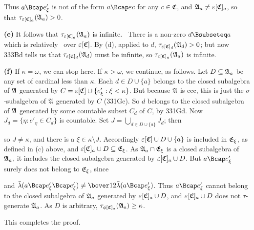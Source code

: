 {\noindent Thus $a\Bcap e'_{\xi}$ is not of the form $a\Bcap\varepsilon c$
for any $c\in\frak C$, and $\frak A_a\ne\varepsilon[\frak C]_a$, so that
$\tau_{\varepsilon[\frak C]_a}(\frak A_a)>0$.\ \Qed

\medskip

{\bf (e)} It follows that $\tau_{\varepsilon[\frak C]_a}(\frak A_a)$ is
infinite.   \Prf\ There is a non-zero $d\Bsubseteq a$ which is
relatively \Mth\ over $\varepsilon[\frak C]$.   By (d), applied
to $d$, $\tau_{\varepsilon[\frak C]_d}(\frak A_d)>0$;  but now 333Bd tells us
that $\tau_{\varepsilon[\frak C]_d}(\frak A_d)$ must be infinite, so
$\tau_{\varepsilon[\frak C]_a}(\frak A_a)$ is infinite.\ \Qed

\medskip

{\bf (f)} If $\kappa=\omega$, we can stop here.   If $\kappa>\omega$, we
continue, as follows.   Let $D\subseteq\frak A_a$ be any set of cardinal
less than $\kappa$.   Each $d\in D\cup\{a\}$ belongs to the closed
subalgebra of $\frak A$ generated by
$C=\varepsilon[\frak C]\cup\{e'_{\xi}:\xi<\kappa\}$.
But because $\frak A$ is
ccc, this is just the $\sigma$-subalgebra of $\frak A$ generated by
$C$ (331Ge).   So $d$ belongs to the closed subalgebra of $\frak A$
generated by some countable subset $C_d$ of $C$, by 331Gd.   Now
$J_d=\{\eta:e'_{\eta}\in C_d\}$ is countable.   Set
$J=\bigcup_{d\in D\cup\{a\}}J_d$;  then


\noindent so $J\ne\kappa$, and there is a $\xi\in\kappa\setminus J$.
Accordingly $\varepsilon[\frak C]\cup D\cup\{a\}$ is included in
$\frak E_{\xi}$, as defined in (c) above, and
$\varepsilon[\frak C]_a\cup D\subseteq\frak E_{\xi}$.   As
$\frak A_a\cap\frak E_{\xi}$ is a closed
subalgebra of $\frak A_a$, it includes the closed subalgebra
generated by $\varepsilon[\frak C]_a\cup D$.   But $a\Bcap e'_{\xi}$ surely
does not belong to $\frak E_{\xi}$, since


\noindent and $\bar\lambda(a\Bcap e'_{\xi}\Bcap
e'_{\xi})\ne\bover12\bar\lambda(a\Bcap e'_{\xi})$.   Thus
$a\Bcap e'_{\xi}$
cannot belong to the closed subalgebra of $\frak A_a$ generated by
$\varepsilon[\frak C]_a\cup D$, and $\varepsilon[\frak C]_a\cup D$ does not
$\tau$-generate $\frak A_a$.   As $D$ is arbitrary,
$\tau_{\phi[\frak C]_a}(\frak A_a)\ge\kappa$.

This completes the proof.
}%


